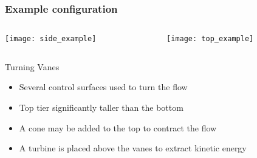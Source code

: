 \documentclass[mathserif]{beamer}
\begin{document}
%
%
%
\begin{frame}
\frametitle{Example configuration}

\begin{columns}[]
  \begin{column}{0.5\linewidth}

   \begin{center}
    \texttt{[image: side\_example]}
   \end{center}

  \end{column}
  \begin{column}{0.5\linewidth}

   \begin{center}
    \texttt{[image: top\_example]}
   \end{center}

  \end{column}
\end{columns}

   \begin{block}{Turning Vanes}
    \begin{itemize}
     \item Several control surfaces used to turn the flow
     \item Top tier significantly taller than the bottom
     \item A cone may be added to the top to contract the flow
     \item A turbine is placed above the vanes to extract kinetic energy
    \end{itemize}
   \end{block}
   
\end{frame}
\end{document}

